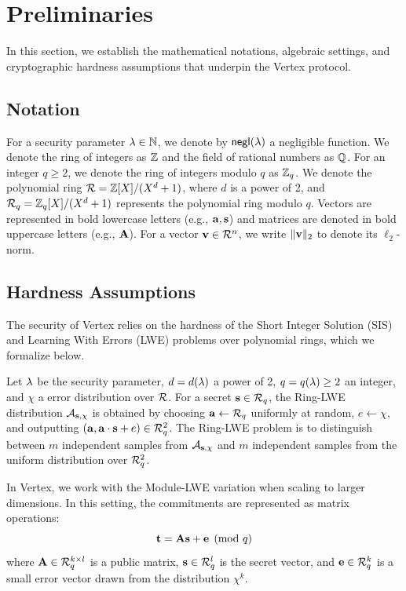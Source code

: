 \section{Preliminaries}
\label{sec:prelims}

In this section, we establish the mathematical notations, algebraic settings, and cryptographic hardness assumptions that underpin the Vertex protocol.

\subsection{Notation}
For a security parameter $\lambda \in \mathbb{N}$, we denote by $\mathsf{negl}(\lambda)$ a negligible function. We denote the ring of integers as $\mathbb{Z}$ and the field of rational numbers as $\mathbb{Q}$. For an integer $q \ge 2$, we denote the ring of integers modulo $q$ as $\mathbb{Z}_q$. We denote the polynomial ring $\mathcal{R} = \mathbb{Z}[X]/(X^d + 1)$, where $d$ is a power of 2, and $\mathcal{R}_q = \mathbb{Z}_q[X]/(X^d + 1)$ represents the polynomial ring modulo $q$.
Vectors are represented in bold lowercase letters (e.g., $\mathbf{a}, \mathbf{s}$) and matrices are denoted in bold uppercase letters (e.g., $\mathbf{A}$). For a vector $\mathbf{v} \in \mathcal{R}^n$, we write $\|\mathbf{v}\|_2$ to denote its $\ell_2$-norm.

\subsection{Hardness Assumptions}
The security of Vertex relies on the hardness of the Short Integer Solution (SIS) and Learning With Errors (LWE) problems over polynomial rings, which we formalize below.

\begin{definition}
Let $\lambda$ be the security parameter, $d = d(\lambda)$ a power of 2, $q = q(\lambda) \ge 2$ an integer, and $\chi$ a error distribution over $\mathcal{R}$. For a secret $\mathbf{s} \in \mathcal{R}_q$, the Ring-LWE distribution $\mathcal{A}_{\mathbf{s}, \chi}$ is obtained by choosing $\mathbf{a} \leftarrow \mathcal{R}_q$ uniformly at random, $e \leftarrow \chi$, and outputting $(\mathbf{a}, \mathbf{a} \cdot \mathbf{s} + e) \in \mathcal{R}_q^2$. The Ring-LWE problem is to distinguish between $m$ independent samples from $\mathcal{A}_{\mathbf{s}, \chi}$ and $m$ independent samples from the uniform distribution over $\mathcal{R}_q^2$.
\end{definition}

In Vertex, we work with the Module-LWE variation when scaling to larger dimensions. In this setting, the commitments are represented as matrix operations:
\begin{equation}
  \mathbf{t} = \mathbf{A}\mathbf{s} + \mathbf{e} \pmod q
\end{equation}
where $\mathbf{A} \in \mathcal{R}_q^{k \times l}$ is a public matrix, $\mathbf{s} \in \mathcal{R}_q^l$ is the secret vector, and $\mathbf{e} \in \mathcal{R}_q^k$ is a small error vector drawn from the distribution $\chi^k$.
